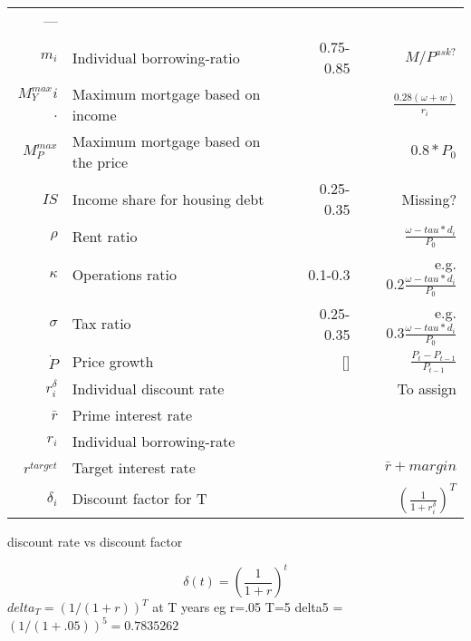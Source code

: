 \begin{tabular}{rlrr}
---       &  & \\
$m_i$          & Individual borrowing-ratio           & 0.75-0.85  & $M/P^{ask?}$ \\
$M^{max}_Yi$.  & Maximum mortgage based on income     &            & $\frac{0.28(\omega+w)}{r_i}$ \\
 $M^{max}_P$   & Maximum mortgage based on the price  &            & $0.8*P_0$ \\
$IS$           & Income share for housing debt        & 0.25-0.35  & Missing? \\
$\rho$         & Rent ratio                           &            & $\frac{\omega-tau*d_i}{P_0}$ \\
$\kappa $      & Operations ratio                     & 0.1-0.3    & e.g. $ 0.2\frac{\omega-tau*d_i}{P_0}$ \\
$\sigma$       & Tax ratio                            & 0.25-0.35  & e.g. $ 0.3\frac{\omega-tau*d_i}{P_0}$ \\
$\dot P $      & Price growth                         & []         & $\frac{P_t-P_{t-1}}{P_{t-1}}$\\
$r_i^\delta$   & Individual discount rate             &            & To assign \\
$\bar r$       & Prime interest rate                  &            & \\
$r_i$          & Individual borrowing-rate            &            & \\
$r^{target}$   & Target interest rate                 &            & $\bar r + margin$ \\
$\delta_i$     & Discount factor for T                &            & $\left(\frac{1}{1+r_i^\delta}\right)^T$ \\


\end{tabular}
\renewcommand{\arraystretch}{1.0}




discount rate vs discount factor

\[\delta(t)=\left(\frac{1}{1+r}\right)^t\]
    $delta_T=  (1/(1+r))^T$   at T years
    eg r=.05  T=5  delta5 =  $(1/(1+.05))^5 = 0.7835262$
